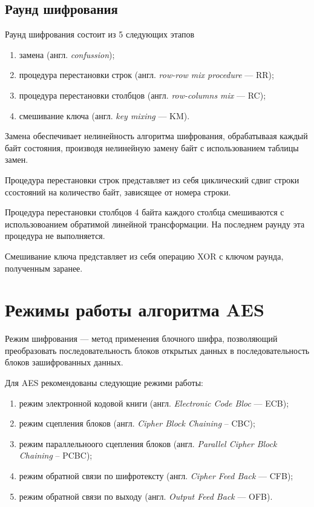 \subsection{Раунд шифрования}

Раунд шифрования состоит из 5 следующих этапов
\begin{enumerate}[label=\arabic*)]
	\item замена (англ. \textit{confussion});
	\item процедура перестановки строк (англ. \textit{row-row mix procedure} --- RR);
	\item процедура перестановки столбцов (англ. \textit{row-columns mix} --- RC);
	\item смешивание ключа (англ. \textit{key mixing} --- KM).
\end{enumerate}

Замена обеспечивает нелинейность алгоритма шифрования, обрабатываая каждый байт состояния, производя нелинейную замену байт с использованием таблицы замен.

Процедура перестановки строк представляет из себя циклический сдвиг строки ссостояний на количество байт, зависящее от номера строки.

Процедура перестановки столбцов 4 байта каждого столбца смешиваются с использовоанием обратимой линейной трансформации. На последнем раунду эта процедура не выполняется.

Смешивание ключа представляет из себя операцию XOR с ключом раунда, полученным заранее.

\section{Режимы работы алгоритма AES}

Режим шифрования --- метод применения блочного шифра, позволяющий преобразовать последовательность блоков открытых данных в последовательность блоков зашифрованных данных.

Для AES рекомендованы следующие режими работы:
\begin{enumerate}[label=\arabic*)]
	\item режим электронной кодовой книги (англ. \textit{Electronic Code Bloc} --- ECB);
	\item режим сцепления блоков (англ. \textit{Cipher Block Chaining} -- CBC);
	\item режим параллельноого сцепления блоков (англ. \textit{Parallel Cipher Block Chaining} -- PCBC);
	\item режим обратной связи по шифротексту (англ. \textit{Cipher Feed Back} --- CFB);
	\item режим обратной связи по выходу (англ. \textit{Output Feed Back} --- OFB).
\end{enumerate}

